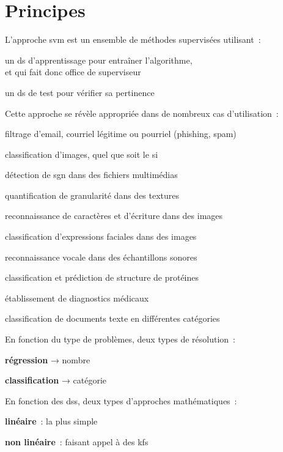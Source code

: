 \section{Principes}

L’approche \gls{svm} est un ensemble de méthodes supervisées utilisant :
\begin{enum}
\item{un \gls{ds} d’apprentissage pour entraîner l’algorithme,\\
et qui fait donc office de superviseur}
\item{un \gls{ds} de test pour vérifier sa pertinence}
\end{enum}

Cette approche se révèle appropriée dans de nombreux cas d’utilisation :
\begin{itmz}
\item{filtrage d’email, courriel légitime ou pourriel (phishing, spam)}
\item{classification d’images, quel que soit le \gls{si}}
\item{détection de \gls{sgn} dans des fichiers multimédias}
\item{quantification de granularité dans des textures}
\item{reconnaissance de caractères et d’écriture dans des images}
\item{classification d’expressions faciales dans des images}
\item{reconnaissance vocale dans des échantillons sonores}
\item{classification et prédiction de structure de protéines}
\item{établissement de diagnostics médicaux}
\item{classification de documents texte en différentes catégories}
\end{itmz}

En fonction du type de problèmes, deux types de résolution :
\begin{itmz}
\item{\textbf{régression} → nombre}
\item{\textbf{classification} → catégorie}
\end{itmz}

En fonction des \glspl{ds}, deux types d’approches mathématiques :
\begin{itmz}
\item{\textbf{linéaire} : la plus simple}
\item{\textbf{non linéaire} : faisant appel à des \glspl{kf}}
\end{itmz}

